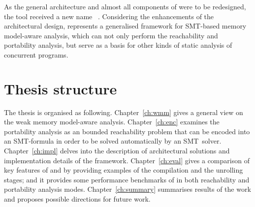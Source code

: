 As the general architecture and almost all components of \porthos{} were to be redesigned, the tool received a new name \textit{\porthos[2]}\,%
%
. %
%
Considering the enhancements of the architectural design, \porthos[2] represents a generalised framework for SMT-based memory model-aware analysis, which can not only perform the reachability and portability analysis, but serve as a basis for other kinds of static analysis of concurrent programs.


\section{Thesis structure}
\label{ch:intro:structure}

The thesis is organised as following.
Chapter~\ref{ch:wmm} gives a general view on the weak memory model-aware analysis.
Chapter~\ref{ch:enc} examines the portability analysis as an bounded reachability problem that can be encoded into an SMT-formula in order to be solved automatically by an SMT~solver.
Chapter~\ref{ch:impl} delves into the description of architectural solutions and implementation details of the \porthos[2] framework.
Chapter~\ref{ch:eval} gives a comparison of key features of \porthos[2] and \porthos[1] by providing examples of the compilation and the unrolling stages; and it provides some performance benchmarks of \porthos[2] in both reachability and portability analysis modes.
Chapter~\ref{ch:summary} summarises results of the work and proposes possible directions for future work.
